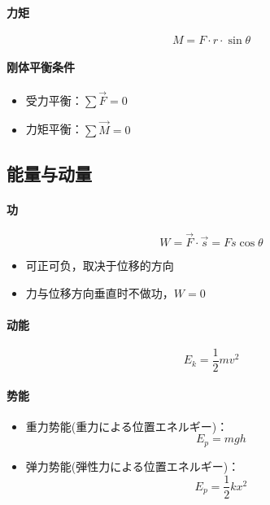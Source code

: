 \paragraph{力矩}
\begin{equation*}
    M=F\cdot r\cdot\sin\theta
\end{equation*}

\paragraph{刚体平衡条件}
\begin{itemize}
    \item 受力平衡：$\sum\vec{F}=0$
    \item 力矩平衡：$\sum\vec{M}=0$
\end{itemize}

\subsection{能量与动量}

\paragraph{功}
\begin{equation*}
    W=\vec{F}\cdot\vec{s}=Fs\cos\theta
\end{equation*}
\begin{itemize}
    \item 可正可负，取决于位移的方向
    \item 力与位移方向垂直时不做功，$W=0$
\end{itemize}

\paragraph{动能}
\begin{equation*}
    E_k=\frac12mv^2
\end{equation*}

\paragraph{势能}
\begin{itemize}
    \item 重力势能(重力による位置エネルギー)：
    \begin{equation*}
        E_p=mgh
    \end{equation*}
    \item 弹力势能(弾性力による位置エネルギー)：
    \begin{equation*}
        E_p=\frac12kx^2
    \end{equation*}    
\end{itemize}

